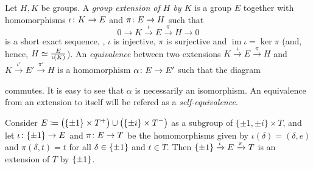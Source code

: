 \begin{defi}
    Let $H, K$ be groups. 
    A \emph{group extension of $H$ by $K$} is a group $E$ together with homomorphisms $\iota\colon K \to E$ and $\pi\colon E \to H$ such that 
    \begin{equation}\label{eq:short-exact-sequence}
        0 \rightarrow K \xrightarrow{\iota} E \xrightarrow{\pi} H \rightarrow 0
    \end{equation}
    is a short exact sequence, \ie,
    $\iota$ is injective, $\pi$ is surjective and $\operatorname{im} \iota = \ker \pi$ (and, hence, $H \simeq \frac{E}{\iota(K)}$). 
    An \emph{equivalence} between two extensions $K \xrightarrow{\iota} E \xrightarrow{\pi} H$ and $K \xrightarrow{\iota'} E' \xrightarrow{\pi'} H$ is a homomorphism $\alpha\colon E \to E'$ such that the diagram
	\begin{center}
	\end{center}
	commutes. 
	It is easy to see that $\alpha$ is necessarily an isomorphism. 
	An equivalence from an extension to itself will be refered as a \emph{self-equivalence}.
\end{defi}

\begin{ex}\label{ex:main-extension}
    Consider $E \coloneqq \big(\{ \pm 1 \} \times T^+\big) \cup \big(\{\pm i\} \times T^-\big)$ as a subgroup of $\{ \pm 1, \pm i \} \times T$, and let $\iota\colon \{ \pm 1 \} \to E$ and $\pi\colon E \to T$ be the homomorphisms given by $\iota(\delta) = (\delta, e)$ and $\pi (\delta, t) = t$ for all $\delta \in \{ \pm 1 \}$ and $t\in T$. 
    Then $\{ \pm 1 \} \xrightarrow{\iota} E \xrightarrow{\pi} T$ is an extension of $T$ by $\{ \pm 1 \}$.
\end{ex}

